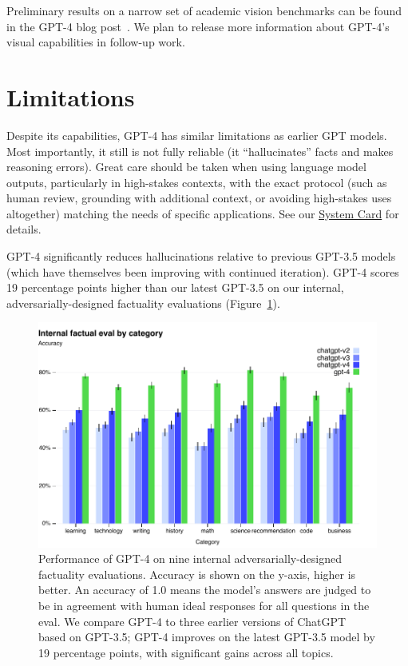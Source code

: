 \documentclass{article}
\begin{document}
Preliminary results on a narrow set of academic vision benchmarks can be found in the GPT-4 blog post~\cite{openaigpt4blog}. We plan to release more information about GPT-4's visual capabilities in follow-up work.











\section{Limitations}

Despite its capabilities, GPT-4 has similar limitations as earlier GPT models. Most importantly, it still is not fully reliable (it ``hallucinates'' facts and makes reasoning errors). Great care should be taken when using language model outputs, particularly in high-stakes contexts, with the exact protocol (such as human review, grounding with additional context, or avoiding high-stakes uses altogether) matching the needs of specific applications. See our \hyperref[systemcard]{System Card} for details.

GPT-4 significantly reduces hallucinations relative to previous GPT-3.5 models (which have themselves been improving with continued iteration). GPT-4 scores 19 percentage points higher than our latest GPT-3.5 on our internal, adversarially-designed factuality evaluations (Figure~\ref{fig:factual}).


\begin{figure}[htbp]
    \centering
    \includegraphics[width=\linewidth]{assets/factual}
    \caption{Performance of GPT-4 on nine internal adversarially-designed factuality evaluations. Accuracy is shown on the y-axis, higher is better. An accuracy of 1.0 means the model's answers are judged to be in agreement with human ideal responses for all questions in the eval. We compare GPT-4 to three earlier versions of ChatGPT~\cite{openaichatgptblog} based on GPT-3.5; GPT-4 improves on the latest GPT-3.5 model by 19 percentage points, with significant gains across all topics.}
    \label{fig:factual}
\end{figure}
\end{document}
